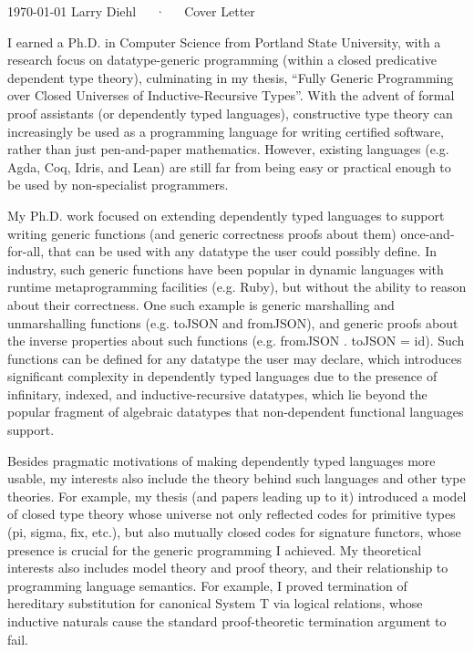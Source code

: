 \documentclass[11pt, a4paper]{awesome-cv}
\begin{document}
\makecvheader

\makecvfooter
  {\today}
  {Larry Diehl~~~·~~~Cover Letter}
  {}

\makelettertitle

\begin{cvletter}


I earned a Ph.D. in Computer Science from Portland State University,
with a research focus on datatype-generic programming (within a closed
predicative dependent type theory), culminating in my thesis, ``Fully
Generic Programming over Closed Universes of Inductive-Recursive
Types''. With the advent of formal proof assistants (or dependently typed
languages), constructive type theory can increasingly be used as a
programming language for writing certified software, rather than just
pen-and-paper mathematics. However, existing languages (e.g. Agda,
Coq, Idris, and Lean) are still far from being easy or practical
enough to be used by non-specialist programmers.

My Ph.D. work focused on extending dependently typed languages to
support writing generic functions (and generic correctness proofs
about them) once-and-for-all, that can be used with any datatype the
user could possibly define. In industry, such generic functions have
been popular in dynamic languages with runtime metaprogramming
facilities (e.g. Ruby), but without the ability to reason about their
correctness. One such example is generic marshalling and unmarshalling
functions (e.g. toJSON and fromJSON), and generic proofs about the
inverse properties about such functions (e.g. fromJSON . toJSON =
id). Such functions can be defined for any datatype the user may
declare, which introduces significant complexity in dependently typed
languages due to the presence of infinitary, indexed, and
inductive-recursive datatypes, which lie beyond the popular fragment
of algebraic datatypes that non-dependent functional languages
support.

Besides pragmatic motivations of making dependently typed languages
more usable, my interests also include the theory behind such
languages and other type theories. For example, my thesis (and papers
leading up to it) introduced a model of closed type theory whose
universe not only reflected codes for primitive types (pi, sigma, fix,
etc.), but also mutually closed codes for signature functors, whose
presence is crucial for the generic programming I achieved. My
theoretical interests also includes model theory and proof theory, and
their relationship to programming language semantics. For example, I
proved termination of hereditary substitution for canonical
System T via logical relations, whose inductive naturals cause the
standard proof-theoretic termination argument to fail.


\end{cvletter}
\end{document}
